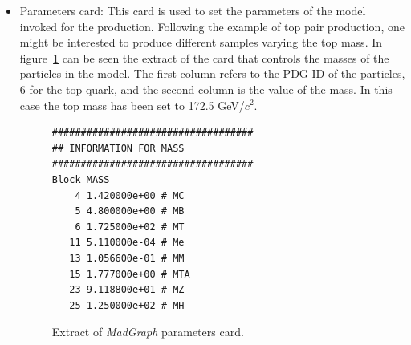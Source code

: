 \begin{itemize}
\begin{itemize}
    \item Parameters card: This card is used to set the parameters of the model invoked for the production. Following the example of top pair production, one might be interested to produce different samples varying the top mass. In figure~\ref{fig:ParamCard} can be seen the extract of the card that controls the masses of the particles in the model. The first column refers to the PDG ID of the particles, 6 for the top quark, and the second column is the value of the mass. In this case the top mass has been set to 172.5 GeV/$c^{2}$.
    \begin{figure}[!Hhtbp]
      \begin{center}
        \begin{minipage}[c]{0.45\textwidth}
\begin{verbatim}
###################################
## INFORMATION FOR MASS
###################################
Block MASS 
    4 1.420000e+00 # MC 
    5 4.800000e+00 # MB 
    6 1.725000e+02 # MT 
   11 5.110000e-04 # Me 
   13 1.056600e-01 # MM 
   15 1.777000e+00 # MTA 
   23 9.118800e+01 # MZ 
   25 1.250000e+02 # MH 
\end{verbatim}
        \end{minipage}
          \caption{Extract of \textit{MadGraph} parameters card.}
          \label{fig:ParamCard}
      \end{center}
    \end{figure}


\end{itemize}
\end{itemize}
